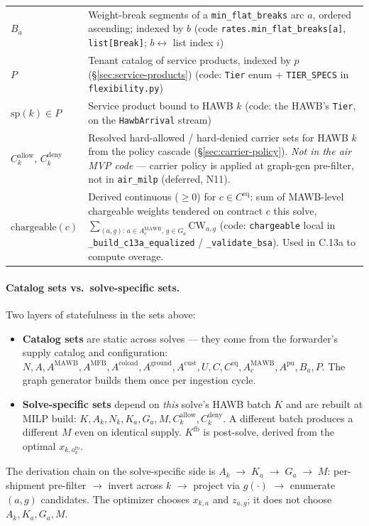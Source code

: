 \documentclass[11pt,a4paper]{article}
\theoremstyle{definition}
\begin{document}
\begin{table}[H]
\begin{tabular}{lp{11.5cm}}
$B_a$ & Weight-break segments of a \texttt{min\_flat\_breaks} arc $a$, ordered ascending; indexed by $b$ (code \texttt{rates.min\_flat\_breaks[a]}, \texttt{list[Break]}; $b \leftrightarrow$ list index $i$) \\
$P$ & Tenant catalog of service products, indexed by $p$ (\S\ref{sec:service-products}) (code: \texttt{Tier} enum + \texttt{TIER\_SPECS} in \texttt{flexibility.py}) \\
$\text{sp}(k) \in P$ & Service product bound to HAWB $k$ (code: the HAWB's \texttt{Tier}, on the \texttt{HawbArrival} stream) \\
$C_k^{\text{allow}},\, C_k^{\text{deny}}$ & Resolved hard-allowed / hard-denied carrier sets for HAWB $k$ from the policy cascade (\S\ref{sec:carrier-policy}). \emph{Not in the air MVP code} --- carrier policy is applied at graph-gen pre-filter, not in \texttt{air\_milp} (deferred, N11). \\
$\text{chargeable}(c)$ & Derived continuous (\(\geq 0\)) for $c \in C^{\text{eq}}$: sum of MAWB-level chargeable weights tendered on contract $c$ this solve, $\sum_{(a,g):\, a \in A_c^{\text{MAWB}},\, g \in G_a} \text{CW}_{a,g}$ (code: \texttt{chargeable} local in \texttt{\_build\_c13a\_equalized} / \texttt{\_validate\_bsa}). Used in C.13a to compute overage. \\
\bottomrule
\end{tabular}
\end{table}

\paragraph{Catalog sets vs.\ solve-specific sets.}
Two layers of statefulness in the sets above:
\begin{itemize}[noitemsep]
  \item \textbf{Catalog sets} are static across solves --- they come from
        the forwarder's supply catalog and configuration: $N, A, A^{\text{MAWB}},
        A^{\text{MFB}}, A^{\text{coload}}, A^{\text{ground}}, A^{\text{cust}},
        U, C, C^{\text{eq}}, A_c^{\text{MAWB}}, A^{\text{pu}}, B_a, P$. The
        graph generator builds them once per ingestion cycle.
  \item \textbf{Solve-specific sets} depend on \emph{this} solve's HAWB batch
        $K$ and are rebuilt at MILP build: $K, A_k, N_k, K_a, G_a, M,
        C_k^{\text{allow}}, C_k^{\text{deny}}$. A different
        batch produces a different $M$ even on identical supply. $K^{\text{fb}}$
        is post-solve, derived from the optimal $x_{k, a^{\text{fb}}_k}$.
\end{itemize}
The derivation chain on the solve-specific side is $A_k \;\to\; K_a \;\to\; G_a
\;\to\; M$: per-shipment pre-filter $\to$ invert across $k$ $\to$ project via
$g(\cdot)$ $\to$ enumerate $(a, g)$ candidates. The optimizer chooses
$x_{k,a}$ and $z_{a,g}$; it does not choose $A_k, K_a, G_a, M$.
\end{document}
